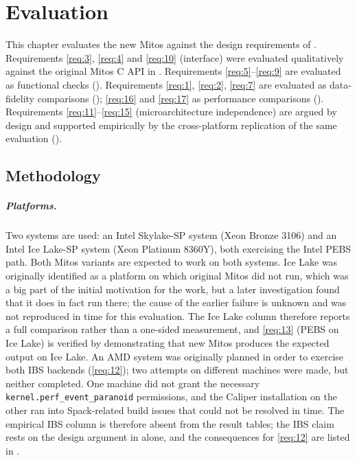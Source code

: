 \chapter{Evaluation}\label{chap:evaluation}

This chapter evaluates the new Mitos against the design requirements of . Requirements \ref{req:3}, \ref{req:4} and \ref{req:10} (interface) were evaluated qualitatively against the original Mitos C API in . Requirements \ref{req:5}--\ref{req:9} are evaluated as functional checks (). Requirements \ref{req:1}, \ref{req:2}, \ref{req:7} are evaluated as data-fidelity comparisons (); \ref{req:16} and \ref{req:17} as performance comparisons (). Requirements \ref{req:11}--\ref{req:15} (microarchitecture independence) are argued by design and supported empirically by the cross-platform replication of the same evaluation ().

\section{Methodology}\label{sec:eval-methodology}

\paragraph{Platforms.} Two systems are used: an Intel Skylake-SP system (Xeon Bronze 3106) and an Intel Ice Lake-SP system (Xeon Platinum 8360Y), both exercising the Intel PEBS path. Both Mitos variants are expected to work on both systems. Ice Lake was originally identified as a platform on which original Mitos did not run, which was a big part of the initial motivation for the work, but a later investigation found that it does in fact run there; the cause of the earlier failure is unknown and was not reproduced in time for this evaluation. The Ice Lake column therefore reports a full comparison rather than a one-sided measurement, and \ref{req:13} (PEBS on Ice Lake) is verified by demonstrating that new Mitos produces the expected output on Ice Lake. An AMD system was originally planned in order to exercise both IBS backends (\ref{req:12}); two attempts on different machines were made, but neither completed. One machine did not grant the necessary \texttt{kernel.perf\_event\_paranoid} permissions, and the Caliper installation on the other ran into Spack-related build issues that could not be resolved in time. The empirical IBS column is therefore absent from the result tables; the IBS claim rests on the design argument in  alone, and the consequences for \ref{req:12} are listed in .


